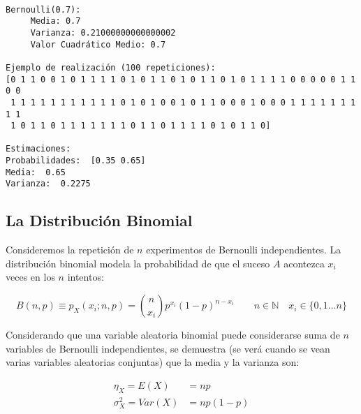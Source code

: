 \documentclass[11pt]{article}
\begin{document}
    \begin{center}
    \end{center}
    { \hspace*{\fill} \\}
    
    \begin{Verbatim}[commandchars=\\\{\}]
Bernoulli(0.7):
	 Media: 0.7
	 Varianza: 0.21000000000000002
	 Valor Cuadrático Medio: 0.7

Ejemplo de realización (100 repeticiones):
[0 1 1 0 0 1 0 1 1 1 1 0 1 0 1 1 0 1 0 1 1 0 1 0 1 1 1 1 0 0 0 0 0 1 1 0 0
 1 1 1 1 1 1 1 1 1 1 1 0 1 0 1 0 0 1 0 1 1 0 0 0 1 0 0 0 1 1 1 1 1 1 1 1 1
 1 0 1 1 0 1 1 1 1 1 1 1 0 1 1 0 1 1 1 1 0 1 0 1 1 0]

Estimaciones:
Probabilidades:  [0.35 0.65]
Media:  0.65 
Varianza:  0.2275

    \end{Verbatim}

    \hypertarget{la-distribuciuxf3n-binomial}{%
\subsection*{La Distribución
Binomial}\label{la-distribuciuxf3n-binomial}}

Consideremos la repetición de \(n\) experimentos de Bernoulli
independientes. La distribución binomial modela la probabilidad de que
el suceso \(A\) acontezca \(x_i\) veces en los \(n\) intentos:

\[B(n,p)\equiv p_X(x_i; n,p) = \binom{n}{x_i}p^{x_i}(1-p)^{n-x_i} \qquad n \in \mathbb{N} \quad x_i \in \{0,1 \ldots n\}\]

Considerando que una variable aleatoria binomial puede considerarse suma
de \(n\) variables de Bernoulli independientes, se demuestra (se verá
cuando se vean varias variables aleatorias conjuntas) que la media y la
varianza son:

\begin{align*}
\eta_X = E(X) &= np\\
\sigma_X^2=Var(X) &= np(1-p)
\end{align*}

    \begin{center}
    \end{center}
    { \hspace*{\fill} \\}
    
\end{document}
